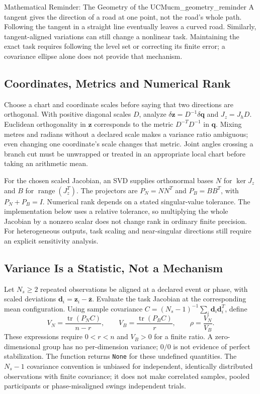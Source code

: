 \begin{laymansbox}{Mathematical Reminder: The Geometry of the UCM}{ucm_geometry_reminder}
A tangent gives the direction of a road at one point, not the road's whole
path. Following the tangent in a straight line eventually leaves a curved
road. Similarly, tangent-aligned variations can still change a nonlinear task.
Maintaining the exact task requires following the level set or correcting
its finite error; a covariance ellipse alone does not provide that mechanism.
\end{laymansbox}

\subsection{Coordinates, Metrics and Numerical Rank}

Choose a chart and coordinate scales before saying that two directions are
orthogonal. With positive diagonal scales $D$, analyze
$\delta\bm z=D^{-1}\delta\bm q$ and $J_z=J_hD$.
Euclidean orthogonality in $\bm z$ corresponds to the metric
$D^{-T}D^{-1}$ in $\bm q$.
Mixing metres and radians without a declared scale makes a variance ratio
ambiguous; even changing one coordinate's scale changes that metric.
Joint angles crossing a branch cut must be unwrapped or treated in an
appropriate local chart before taking an arithmetic mean.

For the chosen scaled Jacobian, an SVD supplies orthonormal bases $N$ for
$\ker J_z$ and $B$ for $\operatorname{range}(J_z^T)$.
The projectors are $P_N=NN^T$ and $P_B=BB^T$, with $P_N+P_B=I$.
Numerical rank depends on a stated singular-value tolerance.
The implementation below uses a relative tolerance, so multiplying the whole
Jacobian by a nonzero scalar does not change rank in ordinary finite precision.
For heterogeneous outputs, task scaling and near-singular directions still
require an explicit sensitivity analysis.

\subsection{Variance Is a Statistic, Not a Mechanism}

Let $N_s\geq2$ repeated observations be aligned at a declared event or phase,
with scaled deviations $\bm d_i=\bm z_i-\bar{\bm z}$.
Evaluate the task Jacobian at the corresponding mean configuration.
Using sample covariance $C=(N_s-1)^{-1}\sum_i\bm d_i\bm d_i^T$, define
\begin{equation}
 V_N=\frac{\operatorname{tr}(P_NC)}{n-r},\qquad
 V_B=\frac{\operatorname{tr}(P_BC)}{r},\qquad
 \rho=\frac{V_N}{V_B}.
 \label{eq:ch1:variance}
\end{equation}
These expressions require $0<r<n$ and $V_B>0$ for a finite ratio.
A zero-dimensional group has no per-dimension variance; $0/0$ is not evidence
of perfect stabilization. The function returns \texttt{None} for these
undefined quantities.
The $N_s-1$ covariance convention is unbiased for independent, identically
distributed observations with finite covariance; it does not make correlated
samples, pooled participants or phase-misaligned swings independent trials.

